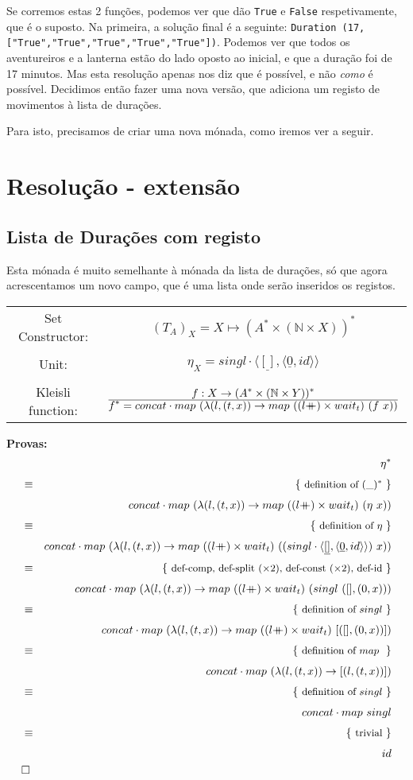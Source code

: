 \documentclass[12pt]{extarticle}
\newcommand{\ffrac}[2]{\ensuremath{\frac{\displaystyle #1}{\displaystyle #2}}}
\newcommand\mdoubleplus{\ensuremath{\mathbin{+\mkern-10mu+}}}
\def\comp{\mathbin{\cdot}}
\def\start{&&}
\def\qed{\\&\Box&}
\def\just#1#2{\\ &#1& \rule{2em}{0pt} \{ \mbox{\rule[-.7em]{0pt}{1.8em} \small #2 \/} \} \nonumber\\ && }
\begin{document}
Se corremos estas 2 funções, podemos ver que dão \texttt{True} e \texttt{False} respetivamente, que é o suposto.
Na primeira, a solução final é a seguinte:
\texttt{Duration (17,["True","True","True","True","True"])}.
Podemos ver que todos os aventureiros e a lanterna estão do lado oposto ao inicial, e que a duração foi de 17 minutos.
Mas esta resolução apenas nos diz que é possível, e não \textit{como} é possível.
Decidimos então fazer uma nova versão, que adiciona um registo de movimentos à lista de durações.

Para isto, precisamos de criar uma nova mónada, como iremos ver a seguir.

\section{Resolução - extensão}
\subsection{Lista de Durações com registo}
Esta mónada é muito semelhante à mónada da lista de durações, só que agora acrescentamos um novo campo, que é uma lista onde serão inseridos os registos.
\begin{center}
    \begin{tabular}{ c c }
        Set Constructor: & $(T_A)_X = X \mapsto (A^* \times (\mathbb{N} \times X))^* $ \\\\  
        Unit: & $ \eta_X = singl \comp \langle \underline{[]}, \langle \underline{0}, id \rangle \rangle$ \\\\
        Kleisli function: & $ \ffrac{f : X \rightarrow (A^* \times (\mathbb{N} \times Y))^*}{f^* = concat \comp map\ (\lambda (l, (t,x)) \rightarrow map\ ((l \mdoubleplus) \times wait_t)\ (f\ x))}$
    \end{tabular}
\end{center}

\textbf{Provas:}
\begin{eqnarray*}
    \start
        \eta^*
    \just\equiv{ definition of $(\_)^*$ }
        concat \comp map\ (\lambda (l, (t,x)) \rightarrow map\ ((l \mdoubleplus) \times wait_t)\ (\eta\ x))
    \just\equiv{ definition of $\eta$ }
        concat \comp map\ (\lambda (l, (t,x)) \rightarrow map\ ((l \mdoubleplus) \times wait_t)\ ((singl \comp \langle \underline{[]}, \langle \underline{0}, id \rangle \rangle)\ x))
    \just\equiv{ def-comp, def-split ($\times 2$), def-const ($\times 2$), def-id }
        concat \comp map\ (\lambda (l, (t,x)) \rightarrow map\ ((l \mdoubleplus) \times wait_t)\ (singl\ ([], (0,x)))
    \just\equiv{ definition of $singl$ }
        concat \comp map\ (\lambda (l, (t,x)) \rightarrow map\ ((l \mdoubleplus) \times wait_t)\ [([], (0,x))])
    \just\equiv{ definition of $map$ }
        concat \comp map\ (\lambda (l, (t,x)) \rightarrow [(l, (t,x))])
    \just\equiv{ definition of $singl$ }
        concat \comp map\ singl
    \just\equiv{ trivial }
        id
    \qed
\end{eqnarray*}
\end{document}
